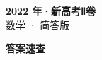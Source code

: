 \documentclass[zihao=-4, a4paper]{ctexart}
\begin{document}
\begin{center}
  {\Large\bfseries 2022 年·新高考Ⅱ卷}\\[4pt]
  {\large 数学 · 简答版}
\end{center}
\medskip
{}

\clearpage
{}
\begin{center}{\Large\bfseries 答案速查}\end{center}
\medskip

\end{document}
